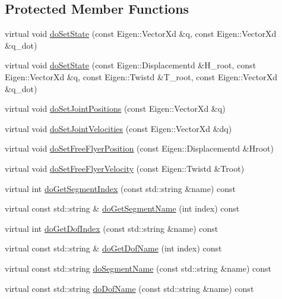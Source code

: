 \subsection*{\-Protected \-Member \-Functions}
\begin{DoxyCompactItemize}
\item 
virtual void \hyperlink{classocra__icub_1_1OcraWbiModel_a8639b19a514624953e5e58dbde1c8227}{do\-Set\-State} (const \-Eigen\-::\-Vector\-Xd \&q, const \-Eigen\-::\-Vector\-Xd \&q\-\_\-dot)
\item 
virtual void \hyperlink{classocra__icub_1_1OcraWbiModel_a411c844cbde565ed54a224e39a2e65c1}{do\-Set\-State} (const \-Eigen\-::\-Displacementd \&\-H\-\_\-root, const \-Eigen\-::\-Vector\-Xd \&q, const \-Eigen\-::\-Twistd \&\-T\-\_\-root, const \-Eigen\-::\-Vector\-Xd \&q\-\_\-dot)
\item 
virtual void \hyperlink{classocra__icub_1_1OcraWbiModel_a64d40044dff11a6302992d52f1dbde0d}{do\-Set\-Joint\-Positions} (const \-Eigen\-::\-Vector\-Xd \&q)
\item 
virtual void \hyperlink{classocra__icub_1_1OcraWbiModel_a26a758c5ecb02601c066bdfffe5db194}{do\-Set\-Joint\-Velocities} (const \-Eigen\-::\-Vector\-Xd \&dq)
\item 
virtual void \hyperlink{classocra__icub_1_1OcraWbiModel_aa2bb481dc7fdb55c363ac1a404a807e5}{do\-Set\-Free\-Flyer\-Position} (const \-Eigen\-::\-Displacementd \&\-Hroot)
\item 
virtual void \hyperlink{classocra__icub_1_1OcraWbiModel_af740a36f6cc2899dcd6f3507b9703c7f}{do\-Set\-Free\-Flyer\-Velocity} (const \-Eigen\-::\-Twistd \&\-Troot)
\item 
virtual int \hyperlink{classocra__icub_1_1OcraWbiModel_ad6a498c6c66d6145b99e91bc631efb77}{do\-Get\-Segment\-Index} (const std\-::string \&name) const 
\item 
virtual const std\-::string \& \hyperlink{classocra__icub_1_1OcraWbiModel_a6a2231f2baece1608297aa3a256edb79}{do\-Get\-Segment\-Name} (int index) const 
\item 
virtual int \hyperlink{classocra__icub_1_1OcraWbiModel_a88842af1291a413848fc500554b12a36}{do\-Get\-Dof\-Index} (const std\-::string \&name) const 
\item 
virtual const std\-::string \& \hyperlink{classocra__icub_1_1OcraWbiModel_ac4ba9f8c3964d3f043543c8196fee185}{do\-Get\-Dof\-Name} (int index) const 
\item 
virtual const std\-::string \hyperlink{classocra__icub_1_1OcraWbiModel_adfe5a0f1fb82248f8cbf309f88a95e6c}{do\-Segment\-Name} (const std\-::string \&name) const 
\item 
virtual const std\-::string \hyperlink{classocra__icub_1_1OcraWbiModel_a3c6be0fe7bb4f205f9fd6a44bb275fc2}{do\-Dof\-Name} (const std\-::string \&name) const 
\end{DoxyCompactItemize}
